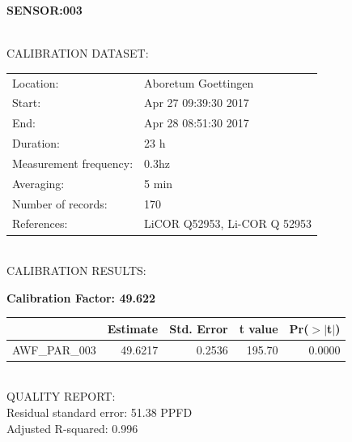 \documentclass[oneside]{report}
\begin{document}
\pagebreak


\begin{center}
\large{\textbf{SENSOR:003}}\\
\end{center}

\hrulefill\\
CALIBRATION DATASET:\\
\begin{table}[h!]
  \centering
  \label{tab:table1}
  \begin{tabular}{ll}
    Location: & Aboretum Goettingen\\ 
    
    
    Start:  & Apr 27 09:39:30 2017 \\
    End:   & Apr 28 08:51:30 2017\\ 
    Duration: & 23 h\\
    Measurement frequency: & 0.3hz\\
    Averaging:  &5 min\\
    Number of records: & 170 \\
    References: & LiCOR Q52953, Li-COR Q 52953 \\
  \end{tabular}
\end{table}

\hrulefill\\
CALIBRATION RESULTS:\\


\begin{center}
\textbf{\large{Calibration Factor: 49.622}}\\
\end{center}
\begin{table}[ht]
\centering
\begin{tabular}{rrrrr}
  \hline
 & Estimate & Std. Error & t value & Pr($>$$|$t$|$) \\ 
  \hline
AWF\_PAR\_003 & 49.6217 & 0.2536 & 195.70 & 0.0000 \\ 
   \hline
\end{tabular}
\end{table}



\hrulefill\\
QUALITY REPORT:\\
Residual standard error: 51.38 PPFD\\
Adjusted R-squared: 0.996
\end{document}
